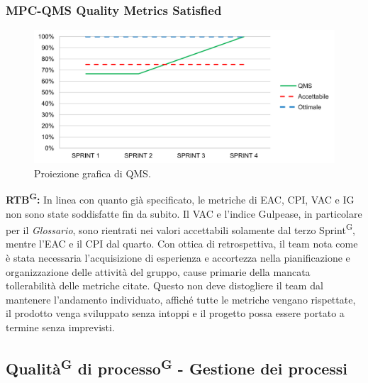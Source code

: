 \documentclass[8pt]{article}
\newcommand{\glossterm}[1]{#1\textsuperscript{G}} %
\begin{document}
\subsubsection{MPC-QMS Quality Metrics Satisfied}
\begin{figure}[h!]
    \centering
    \includegraphics[width=1\textwidth]{images_pdq/QMS.png}
    \caption{Proiezione grafica di QMS.}
    \label{fig:Proiezione grafica di QMS}
\end{figure}
\textbf{\glossterm{RTB}:} In linea con quanto già specificato, le metriche di EAC, CPI, VAC e IG non sono state soddisfatte fin da subito. Il VAC e l'indice Gulpease, in particolare per il \textit{Glossario}, sono rientrati nei valori accettabili solamente dal terzo \glossterm{Sprint}, mentre l'EAC e il CPI dal quarto. Con ottica di retrospettiva, il team nota come è stata necessaria l'acquisizione di esperienza e accortezza nella pianificazione e organizzazione delle attività del gruppo, cause primarie della mancata tollerabilità delle metriche citate. Questo non deve distogliere il team dal mantenere l'andamento individuato, affiché tutte le metriche vengano rispettate, il prodotto venga sviluppato senza intoppi e il progetto possa essere portato a termine senza imprevisti. 
\clearpage
\subsection{\glossterm{Qualità} di \glossterm{processo} - Gestione dei processi}
\end{document}
